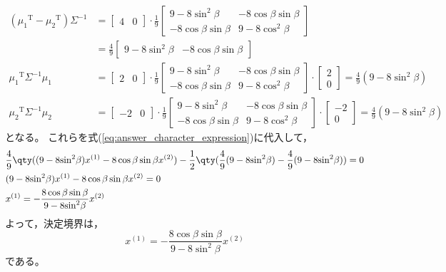 \documentclass[class=jsarticle, crop=false, dvipdfmx, fleqn]{standalone}
\begin{document}
\begin{align}
	({\mu_1}^\mathrm{T} - {\mu_2}^\mathrm{T}) \Sigma^{-1}
		& =
		\begin{bmatrix} 4 & 0 \end{bmatrix} \cdot \frac{1}{9}
		\begin{bmatrix}
			9-8{\sin}^2 \beta & -8 \cos\beta \sin\beta \\
			-8 \cos\beta \sin\beta & 9-8{\cos}^2 \beta
		\end{bmatrix} \\
		& = \frac{4}{9} \begin{bmatrix} 9-8{\sin}^2 \beta & -8 \cos\beta \sin\beta \end{bmatrix} \\
	{\mu_1}^\mathrm{T} \Sigma^{-1} \mu_1
		& = 
		\begin{bmatrix} 2 & 0 \end{bmatrix} \cdot \frac{1}{9}
		\begin{bmatrix}
			9-8{\sin}^2 \beta & -8 \cos\beta \sin\beta \\
			-8 \cos\beta \sin\beta & 9-8{\cos}^2 \beta
		\end{bmatrix}
		\cdot \begin{bmatrix} 2 \\ 0 \end{bmatrix}
		= \frac{4}{9} (9-8{\sin}^2 \beta) \\
	{\mu_2}^\mathrm{T} \Sigma^{-1} \mu_2
		& = 
		\begin{bmatrix} -2 & 0 \end{bmatrix} \cdot \frac{1}{9}
		\begin{bmatrix}
			9-8{\sin}^2 \beta & -8 \cos\beta \sin\beta \\
			-8 \cos\beta \sin\beta & 9-8{\cos}^2 \beta
		\end{bmatrix}
		\cdot \begin{bmatrix} -2 \\ 0 \end{bmatrix}
		= \frac{4}{9} (9-8{\sin}^2 \beta)
\end{align}
となる。
これらを式(\ref{eq:answer_character_expression})に代入して，
\begin{align}
	& \frac{4}{9} \qty((9-8{\sin}^2 \beta) x^{(1)} -8 \cos\beta \sin\beta x^{(2)}) -\frac{1}{2} \qty(\frac{4}{9} (9-8{\sin}^2 \beta) - \frac{4}{9} (9-8{\sin}^2 \beta)) = 0 \\
	& (9-8{\sin}^2 \beta) x^{(1)} -8 \cos\beta \sin\beta x^{(2)} = 0 \\
	& x^{(1)} = -\frac{8 \cos\beta \sin\beta}{9-8{\sin}^2 \beta} x^{(2)}
\end{align}
よって，決定境界は，
\begin{equation}
	x^{(1)} = -\frac{8 \cos\beta \sin\beta}{9-8{\sin}^2 \beta} x^{(2)}
\end{equation}
である。
\end{document}

